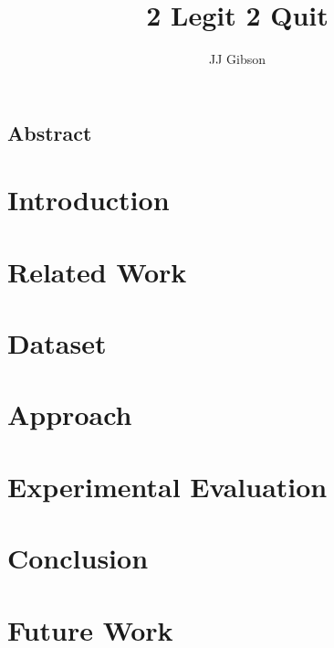 \documentclass[twoside,10pt]{report}
\newcommand{\clearemptydoublepage}{\newpage{\pagestyle{empty}\cleardoublepage}}
\begin{document}
\title{2 Legit 2 Quit}
\author{JJ Gibson}



\clearpage


\clearemptydoublepage
\setcounter{page}{1}

\begin{centering} \section*{Abstract} \end{centering}


\tableofcontents
\clearpage


\setcounter{page}{1}


\chapter{Introduction}
\label{chap:introduction}


\clearpage

\chapter{Related Work}
\label{chap:related_work}


\clearpage

\chapter{Dataset}
\label{chap:dataset}


\clearpage

\chapter{Approach}
\label{chap:approach}


\clearpage

\chapter{Experimental Evaluation}
\label{chap:experimental_evaluation}


\clearpage

\chapter{Conclusion}
\label{chap:discussion}


\clearpage

\chapter{Future Work}
\label{chap:future_work}


\clearpage 

 
{\small }
\end{document}
